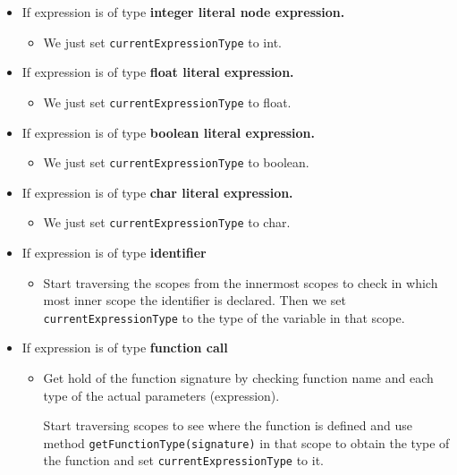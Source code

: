 \begin{itemize}
    \item If expression is of type \textbf{integer literal node expression.}
    \begin{itemize}
        \item We just set \verb!currentExpressionType! to int.
    \end{itemize}
    \item If expression is of type \textbf{float literal expression.}
    \begin{itemize}
        \item We just set \verb!currentExpressionType! to float.
    \end{itemize}
    \item If expression is of type \textbf{boolean literal expression.}
    \begin{itemize}
        \item We just set \verb!currentExpressionType! to boolean.
    \end{itemize}
    \item If expression is of type \textbf{char literal expression.}
    
       \begin{itemize}
        \item We just set \verb!currentExpressionType! to char.
    \end{itemize}
    \item If expression is of type \textbf{identifier}
    \begin{itemize}
        \item Start traversing the scopes from the innermost scopes to check in which most inner scope the identifier is declared. Then we set \verb!currentExpressionType! to the type of the variable in that scope.
    \end{itemize}
 
    \item If expression is of type \textbf{function call}
    \begin{itemize}
        \item     Get hold of the function signature by checking function name and each type of the actual parameters (expression).
    
    Start traversing scopes to see where the function is defined and use method \verb!getFunctionType(signature)! in that scope to obtain the type of the function and set \verb!currentExpressionType! to it.
    \end{itemize}


\end{itemize}




